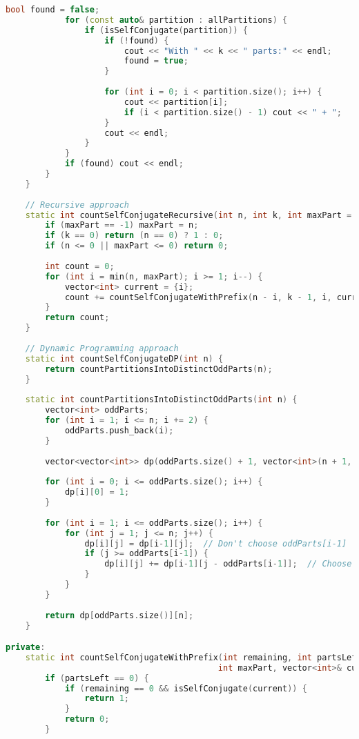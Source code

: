 \documentclass[12pt,a4paper]{article}
\theoremstyle{definition}
\begin{document}
\begin{lstlisting}[language=C++, caption=Chương trình C++ hoàn chỉnh cho bài 2 \& 3]
            bool found = false;
            for (const auto& partition : allPartitions) {
                if (isSelfConjugate(partition)) {
                    if (!found) {
                        cout << "With " << k << " parts:" << endl;
                        found = true;
                    }
                    
                    for (int i = 0; i < partition.size(); i++) {
                        cout << partition[i];
                        if (i < partition.size() - 1) cout << " + ";
                    }
                    cout << endl;
                }
            }
            if (found) cout << endl;
        }
    }
    
    // Recursive approach
    static int countSelfConjugateRecursive(int n, int k, int maxPart = -1) {
        if (maxPart == -1) maxPart = n;
        if (k == 0) return (n == 0) ? 1 : 0;
        if (n <= 0 || maxPart <= 0) return 0;
        
        int count = 0;
        for (int i = min(n, maxPart); i >= 1; i--) {
            vector<int> current = {i};
            count += countSelfConjugateWithPrefix(n - i, k - 1, i, current);
        }
        return count;
    }
    
    // Dynamic Programming approach
    static int countSelfConjugateDP(int n) {
        return countPartitionsIntoDistinctOddParts(n);
    }
    
    static int countPartitionsIntoDistinctOddParts(int n) {
        vector<int> oddParts;
        for (int i = 1; i <= n; i += 2) {
            oddParts.push_back(i);
        }
        
        vector<vector<int>> dp(oddParts.size() + 1, vector<int>(n + 1, 0));
        
        for (int i = 0; i <= oddParts.size(); i++) {
            dp[i][0] = 1;
        }
        
        for (int i = 1; i <= oddParts.size(); i++) {
            for (int j = 1; j <= n; j++) {
                dp[i][j] = dp[i-1][j];  // Don't choose oddParts[i-1]
                if (j >= oddParts[i-1]) {
                    dp[i][j] += dp[i-1][j - oddParts[i-1]];  // Choose oddParts[i-1]
                }
            }
        }
        
        return dp[oddParts.size()][n];
    }

private:
    static int countSelfConjugateWithPrefix(int remaining, int partsLeft, 
                                           int maxPart, vector<int>& current) {
        if (partsLeft == 0) {
            if (remaining == 0 && isSelfConjugate(current)) {
                return 1;
            }
            return 0;
        }
        

\end{lstlisting}
\end{document}
